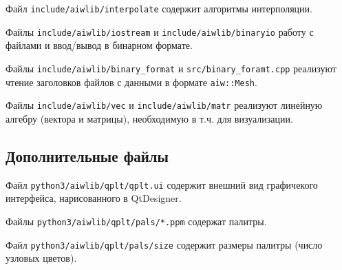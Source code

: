 \documentclass[12pt]{article}
\begin{document}
Файл \verb'include/aiwlib/interpolate' содержит алгоритмы интерполяции.

Файлы \verb'include/aiwlib/iostream' и \verb'include/aiwlib/binaryio' работу с файлами и ввод/вывод в бинарном формате.

Файлы \verb'include/aiwlib/binary_format' и \verb'src/binary_foramt.cpp' реализуют чтение заголовков файлов с данными в формате \verb'aiw::Mesh'.

Файлы \verb'include/aiwlib/vec' и \verb'include/aiwlib/matr' реализуют линейную алгебру (вектора и матрицы), необходимую в т.ч. для визуализации.


\subsection{Дополнительные файлы}
Файл \verb'python3/aiwlib/qplt/qplt.ui' содержит внешний вид графичекого интерфейса, нарисованного в QtDesigner.

Файлы \verb'python3/aiwlib/qplt/pals/*.ppm' содержат палитры.

Файл \verb'python3/aiwlib/qplt/pals/size' содержит размеры палитры (число узловых цветов).
\end{document}
